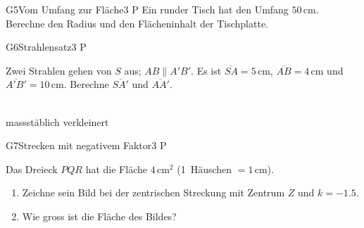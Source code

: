 \documentclass[11pt]{article}
\begin{document}
\begin{lpaufgabe}{G5}{Vom Umfang zur Fläche}{3 P}
Ein runder Tisch hat den Umfang $50\,\text{cm}$. Berechne den Radius und den Flächeninhalt der Tischplatte.
\end{lpaufgabe}


\begin{lpaufgabe}{G6}{Strahlensatz}{3 P}
\begin{minipage}[t]{0.55\linewidth}\vspace{0pt}
Zwei Strahlen gehen von $S$ aus; $AB \parallel A'B'$. Es ist $\overline{SA} = 5\,\text{cm}$, $\overline{AB} = 4\,\text{cm}$ und $\overline{A'B'} = 10\,\text{cm}$.
Berechne $\overline{SA'}$ und $\overline{AA'}$.
\end{minipage}\hfill
\begin{minipage}[t]{0.42\linewidth}\vspace{0pt}\centering
{}\\[-2pt]{\footnotesize massstäblich verkleinert}
\end{minipage}
\end{lpaufgabe}

\begin{lpaufgabe}{G7}{Strecken mit negativem Faktor}{3 P}
\begin{minipage}[t]{0.42\linewidth}\vspace{0pt}
Das Dreieck $PQR$ hat die Fläche $4\,\text{cm}^2$ (1~Häuschen $= 1\,\text{cm}$).
\begin{enumerate}[label=(\alph*),leftmargin=*,itemsep=1pt]
\item Zeichne sein Bild bei der zentrischen Streckung mit Zentrum $Z$ und \mbox{$k = -1.5$}.
\item Wie gross ist die Fläche des Bildes?
\end{enumerate}
\end{minipage}\hfill
\begin{minipage}[t]{0.55\linewidth}\vspace{0pt}\centering
{}
\end{minipage}
\end{lpaufgabe}
\end{document}
